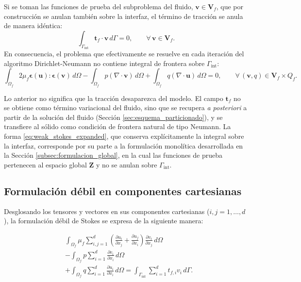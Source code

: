 \documentclass[12pt, letterpaper]{report}
\theoremstyle{definition}
\begin{document}
Si se toman las funciones de prueba del subproblema del fluido, $\mathbf{v} \in \mathbf{V}_f$, que por construcción se anulan también sobre la interfaz, el término de tracción se anula de manera idéntica:
\[
\int_{\Gamma_{\text{int}}} \mathbf{t}_f \cdot \mathbf{v} \, d\Gamma = 0, \qquad \forall \, \mathbf{v} \in \mathbf{V}_f .
\]
En consecuencia, el problema que efectivamente se resuelve en cada iteración del algoritmo Dirichlet-Neumann no contiene integral de frontera sobre $\Gamma_{\text{int}}$:
\begin{equation} \label{eq:weak_stokes_particionado}
    \int_{\Omega_f} 2\mu_f \boldsymbol{\epsilon}(\mathbf{u}) : \boldsymbol{\epsilon}(\mathbf{v}) \, d\Omega - \int_{\Omega_f} p (\nabla \cdot \mathbf{v}) \, d\Omega + \int_{\Omega_f} q (\nabla \cdot \mathbf{u}) \, d\Omega = 0, \qquad \forall \, (\mathbf{v}, q) \in \mathbf{V}_f \times Q_f .
\end{equation}

Lo anterior no significa que la tracción desaparezca del modelo. El campo $\mathbf{t}_f$ no se obtiene como término variacional del fluido, sino que se recupera \emph{a posteriori} a partir de la solución del fluido (Sección \ref{sec:esquema_particionado}), y se transfiere al sólido como condición de frontera natural de tipo Neumann. La forma \eqref{eq:weak_stokes_expanded}, que conserva explícitamente la integral sobre la interfaz, corresponde por su parte a la formulación monolítica desarrollada en la Sección \ref{subsec:formulacion_global}, en la cual las funciones de prueba pertenecen al espacio global $\mathbf{Z}$ y no se anulan sobre $\Gamma_{\text{int}}$.

\subsection{Formulación débil en componentes cartesianas}

Desglosando los tensores y vectores en sus componentes cartesianas ($i, j = 1, \dots, d$), la formulación débil de Stokes se expresa de la siguiente manera:

\begin{equation} \label{eq:stokes_weak_components}
\begin{split}
    &\int_{\Omega_f} \mu_f \sum_{i,j=1}^d \left( \frac{\partial u_i}{\partial x_j} + \frac{\partial u_j}{\partial x_i} \right) \frac{\partial v_i}{\partial x_j} \, d\Omega \\
    &- \int_{\Omega_f} p \sum_{i=1}^d \frac{\partial v_i}{\partial x_i} \, d\Omega \\
    &+ \int_{\Omega_f} q \sum_{i=1}^d \frac{\partial u_i}{\partial x_i} \, d\Omega 
    = \int_{\Gamma_{\text{int}}} \sum_{i=1}^d t_{f,i} v_i \, d\Gamma.
\end{split}
\end{equation}
\end{document}
